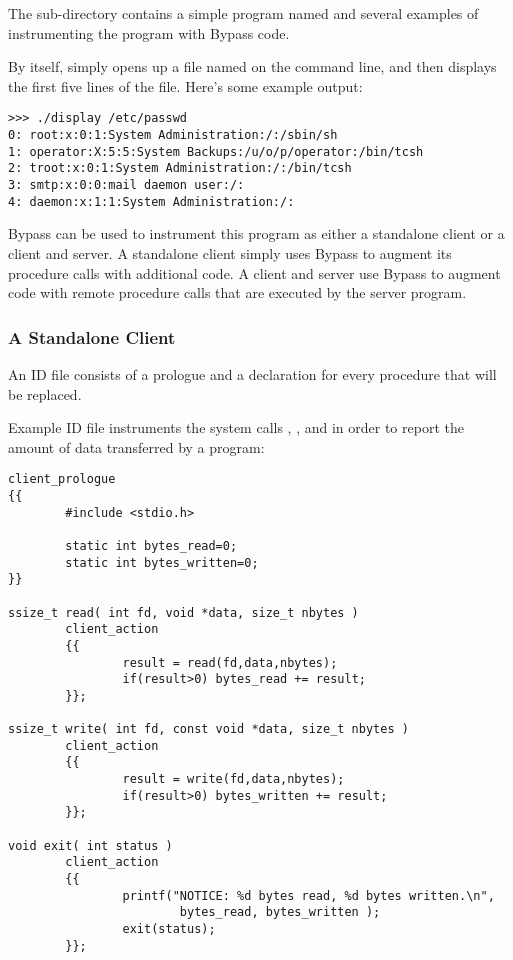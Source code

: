 The  sub-directory contains a simple program named  and several examples of instrumenting the program with Bypass code.

By itself,  simply opens up a file named on the command
line, and then displays the first five lines of the file.  Here's some example output:

\begin{verbatim}
>>> ./display /etc/passwd
0: root:x:0:1:System Administration:/:/sbin/sh
1: operator:X:5:5:System Backups:/u/o/p/operator:/bin/tcsh
2: troot:x:0:1:System Administration:/:/bin/tcsh
3: smtp:x:0:0:mail daemon user:/:
4: daemon:x:1:1:System Administration:/:
\end{verbatim}

Bypass can be used to instrument this program as either a standalone client or a client and server. A standalone client simply uses Bypass to augment its procedure calls with additional code.  A client and server use Bypass to augment code with remote procedure calls that are executed by the server program.

\subsubsection{A Standalone Client}

An ID file consists of a prologue and a declaration for every procedure that will be replaced.

Example ID file  instruments the system calls , , and  in order to report the amount of data transferred by a program:

\begin{verbatim}
client_prologue
{{
        #include <stdio.h>

        static int bytes_read=0;
        static int bytes_written=0;
}}

ssize_t read( int fd, void *data, size_t nbytes )
        client_action
        {{
                result = read(fd,data,nbytes);
                if(result>0) bytes_read += result;
        }};

ssize_t write( int fd, const void *data, size_t nbytes )
        client_action
        {{
                result = write(fd,data,nbytes);
                if(result>0) bytes_written += result;
        }};

void exit( int status )
        client_action
        {{
                printf("NOTICE: %d bytes read, %d bytes written.\n",
                        bytes_read, bytes_written );
                exit(status);
        }};
\end{verbatim}

